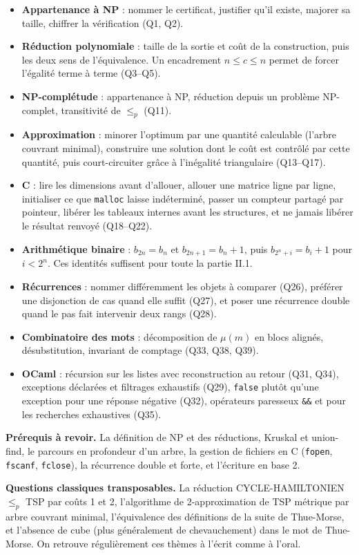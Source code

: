 \documentclass[11pt,a4paper]{article}
\providecommand{\tightlist}{\setlength{\itemsep}{0pt}\setlength{\parskip}{0pt}}
\begin{document}
\begin{itemize}
\tightlist
\item
  \textbf{Appartenance à NP} : nommer le certificat, justifier qu'il existe, majorer sa taille, chiffrer la vérification (Q1, Q2).
\item
  \textbf{Réduction polynomiale} : taille de la sortie et coût de la construction, puis les deux sens de l'équivalence. Un encadrement \(n\le c\le n\) permet de forcer l'égalité terme à terme (Q3--Q5).
\item
  \textbf{NP-complétude} : appartenance à NP, réduction depuis un problème NP-complet, transitivité de \(\le_p\) (Q11).
\item
  \textbf{Approximation} : minorer l'optimum par une quantité calculable (l'arbre couvrant minimal), construire une solution dont le coût est contrôlé par cette quantité, puis court-circuiter grâce à l'inégalité triangulaire (Q13--Q17).
\item
  \textbf{C} : lire les dimensions avant d'allouer, allouer une matrice ligne par ligne, initialiser ce que \texttt{malloc} laisse indéterminé, passer un compteur partagé par pointeur, libérer les tableaux internes avant les structures, et ne jamais libérer le résultat renvoyé (Q18--Q22).
\item
  \textbf{Arithmétique binaire} : \(b_{2n}=b_n\) et \(b_{2n+1}=b_n+1\), puis \(b_{2^n+i}=b_i+1\) pour \(i<2^n\). Ces identités suffisent pour toute la partie II.1.
\item
  \textbf{Récurrences} : nommer différemment les objets à comparer (Q26), préférer une disjonction de cas quand elle suffit (Q27), et poser une récurrence double quand le pas fait intervenir deux rangs (Q28).
\item
  \textbf{Combinatoire des mots} : décomposition de \(\mu(m)\) en blocs alignés, désubstitution, invariant de comptage (Q33, Q38, Q39).
\item
  \textbf{OCaml} : récursion sur les listes avec reconstruction au retour (Q31, Q34), exceptions déclarées et filtrages exhaustifs (Q29), \texttt{false} plutôt qu'une exception pour une réponse négative (Q32), opérateurs paresseux \texttt{\&\&} et \texttt{\textbar{}\textbar{}} pour les recherches exhaustives (Q35).
\end{itemize}

\textbf{Prérequis à revoir.} La définition de NP et des réductions, Kruskal et union-find, le parcours en profondeur d'un arbre, la gestion de fichiers en C (\texttt{fopen}, \texttt{fscanf}, \texttt{fclose}), la récurrence double et forte, et l'écriture en base 2.

\textbf{Questions classiques transposables.} La réduction CYCLE-HAMILTONIEN \(\le_p\) TSP par coûts 1 et 2, l'algorithme de 2-approximation de TSP métrique par arbre couvrant minimal, l'équivalence des définitions de la suite de Thue-Morse, et l'absence de cube (plus généralement de chevauchement) dans le mot de Thue-Morse. On retrouve régulièrement ces thèmes à l'écrit comme à l'oral.
\end{document}
